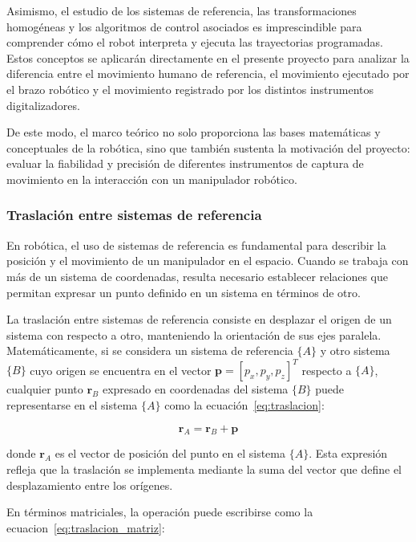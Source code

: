 \documentclass[12pt,a4paper,oneside]{report}
\begin{document}
Asimismo, el estudio de los sistemas de referencia, las transformaciones
homogéneas y los algoritmos de control asociados es imprescindible para
comprender cómo el \gls{robot} interpreta y ejecuta las trayectorias programadas.
Estos conceptos se aplicarán directamente en el presente proyecto para
analizar la diferencia entre el movimiento humano de referencia, el movimiento
ejecutado por el brazo robótico y el movimiento registrado por los distintos
instrumentos digitalizadores.

De este modo, el marco teórico no solo proporciona las bases matemáticas y
conceptuales de la robótica, sino que también sustenta la motivación del
proyecto: evaluar la fiabilidad y precisión de diferentes instrumentos de
captura de movimiento en la interacción con un manipulador robótico.

\subsubsection{Traslación entre sistemas de referencia}

En robótica, el uso de sistemas de referencia es fundamental para describir la
posición y el movimiento de un manipulador en el espacio. Cuando se trabaja con
más de un sistema de coordenadas, resulta necesario establecer relaciones que
permitan expresar un punto definido en un sistema en términos de otro.  

La traslación entre sistemas de referencia consiste en desplazar el origen de
un sistema con respecto a otro, manteniendo la orientación de sus ejes
paralela. Matemáticamente, si se considera un sistema de referencia $\{A\}$ y
otro sistema $\{B\}$ cuyo origen se encuentra en el vector
$\mathbf{p} = [p_x, p_y, p_z]^T$ respecto a $\{A\}$, cualquier punto
$\mathbf{r}_B$ expresado en coordenadas del sistema $\{B\}$ puede representarse
en el sistema $\{A\}$ como la ecuación~\eqref{eq:traslacion}:

\begin{equation}
\mathbf{r}_A = \mathbf{r}_B + \mathbf{p}
\label{eq:traslacion}
\end{equation}

donde $\mathbf{r}_A$ es el vector de posición del punto en el sistema $\{A\}$.
Esta expresión refleja que la traslación se implementa mediante la suma del
vector que define el desplazamiento entre los orígenes.  

En términos matriciales, la operación puede escribirse como la ecuacion~\eqref{eq:traslacion_matriz}:
\end{document}
